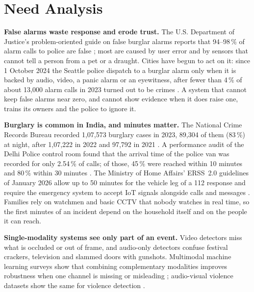 \section{Need Analysis}
\label{sec:need}
\textbf{False alarms waste response and erode trust.} The U.S. Department of Justice's problem-oriented guide on false burglar alarms reports that 94--98\,\% of alarm calls to police are false \cite{sampson2011false}; most are caused by user error and by sensors that cannot tell a person from a pet or a draught. Cities have begun to act on it: since 1 October 2024 the Seattle police dispatch to a burglar alarm only when it is backed by audio, video, a panic alarm or an eyewitness, after fewer than 4\,\% of about 13,000 alarm calls in 2023 turned out to be crimes \cite{seattle2024alarm}. A system that cannot keep false alarms near zero, and cannot show evidence when it does raise one, trains its owners and the police to ignore it.

\textbf{Burglary is common in India, and minutes matter.} The National Crime Records Bureau recorded 1,07,573 burglary cases in 2023, 89,304 of them (83\,\%) at night, after 1,07,222 in 2022 and 97,792 in 2021 \cite{ncrb2025cii2023, ncrb2022}. A performance audit of the Delhi Police control room found that the arrival time of the police van was recorded for only 2.54\,\% of calls; of those, 45\,\% were reached within 10 minutes and 80\,\% within 30 minutes \cite[ch.~5]{cag2020delhi}. The Ministry of Home Affairs' ERSS~2.0 guidelines of January 2026 allow up to 50 minutes for the vehicle leg of a 112 response and require the emergency system to accept IoT signals alongside calls and messages \cite{mha2026erss}. Families rely on watchmen and basic CCTV that nobody watches in real time, so the first minutes of an incident depend on the household itself and on the people it can reach.

\textbf{Single-modality systems see only part of an event.} Video detectors miss what is occluded or out of frame, and audio-only detectors confuse festival crackers, television and slammed doors with gunshots. Multimodal machine learning surveys show that combining complementary modalities improves robustness when one channel is missing or misleading \cite{baltrusaitis2019multimodal, atrey2010fusion}; audio-visual violence datasets show the same for violence detection \cite{wu2020xdviolence}.

